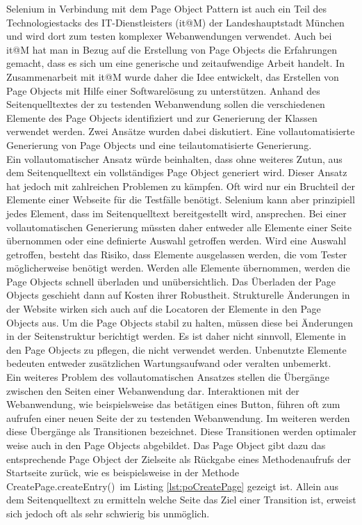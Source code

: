 Selenium in Verbindung mit dem Page Object Pattern ist auch ein Teil des Technologiestacks des IT-Dienstleisters (it@M) der Landeshauptstadt München und wird dort zum testen komplexer Webanwendungen verwendet. Auch bei it@M hat man in Bezug auf die Erstellung von Page Objects die Erfahrungen gemacht, dass es sich um eine generische und zeitaufwendige Arbeit handelt.
In Zusammenarbeit mit it@M wurde daher die Idee entwickelt, das Erstellen von Page Objects mit Hilfe einer Softwarelösung zu unterstützen.
Anhand des Seitenquelltextes der zu testenden Webanwendung sollen die verschiedenen Elemente des Page Objects identifiziert und zur Generierung der Klassen verwendet werden.
Zwei Ansätze wurden dabei diskutiert. Eine vollautomatisierte Generierung von Page Objects und eine teilautomatisierte Generierung.\\
Ein vollautomatischer Ansatz würde beinhalten, dass ohne weiteres Zutun, aus dem Seitenquelltext ein vollständiges Page Object generiert wird. Dieser Ansatz hat jedoch mit zahlreichen Problemen zu kämpfen. Oft wird nur ein Bruchteil der Elemente einer Webseite für die Testfälle benötigt. Selenium kann aber prinzipiell jedes Element, dass im Seitenquelltext bereitgestellt wird, ansprechen. Bei einer vollautomatischen Generierung müssten daher entweder alle Elemente einer Seite übernommen oder eine definierte Auswahl getroffen werden.
Wird eine Auswahl getroffen, besteht das Risiko, dass Elemente ausgelassen werden, die vom Tester möglicherweise benötigt werden. Werden alle Elemente übernommen, werden die Page Objects schnell überladen und unübersichtlich. Das Überladen der Page Objects geschieht dann auf Kosten ihrer Robustheit. Strukturelle Änderungen in der Website wirken sich auch auf die Locatoren der Elemente in den Page Objects aus. Um die Page Objects stabil zu halten, müssen diese bei Änderungen in der Seitenstruktur berichtigt werden.
Es ist daher nicht sinnvoll, Elemente in den Page Objects zu pflegen, die nicht verwendet werden. Unbenutzte Elemente bedeuten entweder zusätzlichen Wartungsaufwand oder veralten unbemerkt.\\
Ein weiteres Problem des vollautomatischen Ansatzes stellen die Übergänge zwischen den Seiten einer Webanwendung dar. Interaktionen mit der Webanwendung, wie beispielsweise das betätigen eines Button, führen oft zum aufrufen einer neuen Seite der zu testenden Webanwendung. Im weiteren werden diese Übergänge als Transitionen bezeichnet. Diese Transitionen werden optimaler weise auch in den Page Objects abgebildet. Das Page Object gibt dazu das entsprechende Page Object der Zielseite als Rückgabe eines Methodenaufrufs der Startseite zurück, wie es beispielsweise in der Methode \grq CreatePage.createEntry()\grq\ im Listing \ref{lst:poCreatePage} gezeigt ist. Allein aus dem Seitenquelltext zu ermitteln welche Seite das Ziel einer Transition ist, erweist sich jedoch oft als sehr schwierig bis unmöglich.\\
